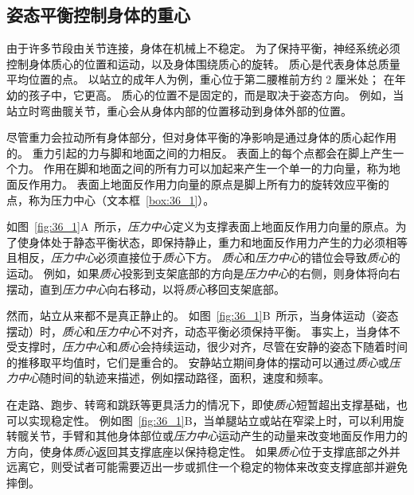 \subsection{姿态平衡控制身体的重心}

由于许多节段由关节连接，身体在机械上不稳定。
为了保持平衡，神经系统必须控制身体质心的位置和运动，以及身体围绕质心的旋转。
质心是代表身体总质量平均位置的点。
以站立的成年人为例，重心位于第二腰椎前方约 2 厘米处；
在年幼的孩子中，它更高。
质心的位置不是固定的，而是取决于姿态方向。
例如，当站立时弯曲髋关节，重心会从身体内部的位置移动到身体外部的位置。


尽管重力会拉动所有身体部分，但对身体平衡的净影响是通过身体的质心起作用的。
重力引起的力与脚和地面之间的力相反。
表面上的每个点都会在脚上产生一个力。
作用在脚和地面之间的所有力可以加起来产生一个单一的力向量，称为地面反作用力。
表面上地面反作用力向量的原点是脚上所有力的旋转效应平衡的点，称为压力中心（文本框~\ref{box:36_1}）。



\begin{proposition}[神经解剖学导航术语] \label{box:36_1}
	
	\quad \quad 如图~\ref{fig:36_1}A~所示，\textit{压力中心}定义为支撑表面上地面反作用力向量的原点。为了使身体处于静态平衡状态，即保持静止，重力和地面反作用力产生的力必须相等且相反，\textit{压力中心}必须直接位于\textit{质心}下方。
	\textit{质心}和\textit{压力中心}的错位会导致\textit{质心}的运动。
	例如，如果\textit{质心}投影到支架底部的方向是\textit{压力中心}的右侧，则身体将向右摆动，直到\textit{压力中心}向右移动，以将\textit{质心}移回支架底部。
	
	\quad \quad 然而，站立从来都不是真正静止的。
	如图~\ref{fig:36_1}B~所示，当身体运动（姿态摆动）时，\textit{质心}和\textit{压力中心}不对齐，动态平衡必须保持平衡。
	事实上，当身体不受支撑时，\textit{压力中心}和\textit{质心}会持续运动，很少对齐，尽管在安静的姿态下随着时间的推移取平均值时，它们是重合的。
	安静站立期间身体的摆动可以通过\textit{质心}或\textit{压力中心}随时间的轨迹来描述，例如摆动路径，面积，速度和频率。
	
	\quad \quad 在走路、跑步、转弯和跳跃等更具活力的情况下，即使\textit{质心}短暂超出支撑基础，也可以实现稳定性。
	例如图~\ref{fig:36_1}B，当单腿站立或站在窄梁上时，可以利用旋转髋关节，手臂和其他身体部位或\textit{压力中心}运动产生的动量来改变地面反作用力的方向，使身体\textit{质心}返回其支撑底座以保持稳定性。
	如果\textit{质心}位于支撑底部之外并远离它，则受试者可能需要迈出一步或抓住一个稳定的物体来改变支撑底部并避免摔倒。
	
\end{proposition}


